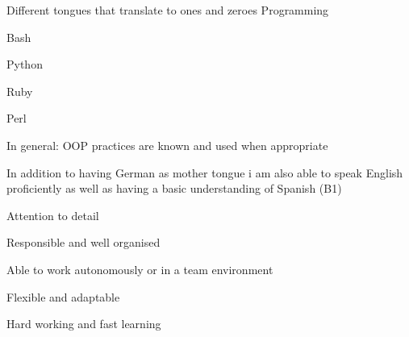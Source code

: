 \begin{cventries}
  \cventry
    {Different tongues that translate to ones and zeroes}
    {Programming}
    {}
    {}
    {
      \begin{cvitems}
        \item Bash
        \item Python
        \item Ruby
        \item Perl
        \item In general: OOP practices are known and used when appropriate
      \end{cvitems}
    }

\end{cventries}


\begin{cvparagraph}
In addition to having German as mother tongue i am also able to speak English proficiently as well as having a basic understanding of Spanish (B1)
\end{cvparagraph}

\newline

\begin{cvparagraph}

\begin{cvitems}
  \item Attention to detail
  \item Responsible and well organised
  \item Able to work autonomously or in a team environment
  \item Flexible and adaptable
  \item Hard working and fast learning
\end{cvitems}
\end{cvparagraph}



